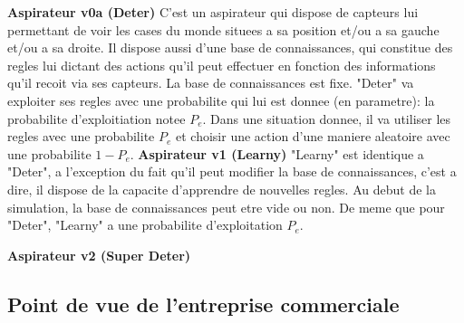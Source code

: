 \documentclass[12pt]{article}
\begin{document}
\justify
\textbf{Aspirateur v0a (Deter)}
\justify
C'est un aspirateur qui dispose de capteurs lui permettant de voir les cases du monde situees a sa position et/ou a sa gauche et/ou a sa droite. Il dispose aussi d'une base de connaissances, qui constitue des regles lui dictant des actions qu'il peut effectuer en fonction des informations qu'il recoit via ses capteurs. La base de connaissances est fixe. "Deter" va exploiter ses regles avec une probabilite qui lui est donnee (en parametre): la probabilite d'exploitiation notee $P_e$. Dans une situation donnee, il va utiliser les regles avec une probabilite $P_e$ et choisir une action d'une maniere aleatoire avec une probabilite $1-P_e$. 
\justify
\textbf{Aspirateur v1 (Learny)}
\justify
"Learny" est identique a "Deter", a l'exception du fait qu'il peut modifier la base de connaissances, c'est a dire, il dispose de la capacite d'apprendre de nouvelles regles. Au debut de la simulation, la base de connaissances peut etre vide ou non. De meme que pour "Deter", "Learny" a une probabilite d'exploitation $P_e$.
\justify

\justify
\textbf{Aspirateur v2 (Super Deter)}
\subsection{Point de vue de l'entreprise commerciale}
\end{document}
